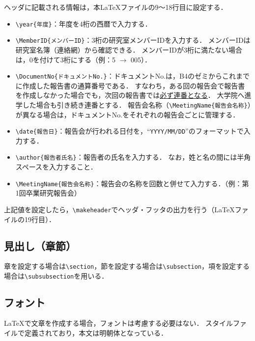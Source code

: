 \documentclass[uplatex]{jsarticle}
\begin{document}
ヘッダに記載される情報は，本\LaTeX ファイルの9〜18行目に設定する．
\begin{itemize}
\item \verb|\year{年度}|：年度を4桁の西暦で入力する．
%
\item \verb|\MemberID{メンバーID}|：3桁の研究室メンバーIDを入力する．
メンバーIDは研究室名簿（連絡網）から確認できる．
メンバーIDが3桁に満たない場合は，0を付けて3桁にする（例：5 $\rightarrow$ 005）．
%
\item \verb|\DocumentNo{ドキュメントNo.}|：ドキュメントNo.は，B4のゼミからこれまでに作成した報告書の通算番号である．
すなわち，ある回の報告会で報告書を作成しなかった場合でも，次回の報告書では\underline{必ず連番となる}．
大学院へ進学した場合も引き続き連番とする．
報告会名称（\verb|\MeetingName{報告会名称}|）が異なる場合は，ドキュメントNo.をそれぞれの報告会ごとに管理する．
%
\item \verb|\date{報告日}|：報告会が行われる日付を，``\texttt{YYYY/MM/DD}''のフォーマットで入力する．
%
\item \verb|\author{報告者氏名}|：報告者の氏名を入力する．
なお，姓と名の間には半角スペースを入力すること．
%
\item \verb|\MeetingName{報告会名称}|：報告会の名称を回数と併せて入力する．（例：第1回卒業研究報告会）

\end{itemize}

上記値を設定したら，\verb|\makeheader|でヘッダ・フッタの出力を行う（\LaTeX ファイルの19行目）．

\subsection{見出し（章節）}
章を設定する場合は\verb|\section|，節を設定する場合は\verb|\subsection|，項を設定する場合は\verb|\subsubsection|を用いる．

\subsection{フォント}
\LaTeX で文章を作成する場合，フォントは考慮する必要はない．
スタイルファイルで定義されており，本文は明朝体となっている．
\end{document}
